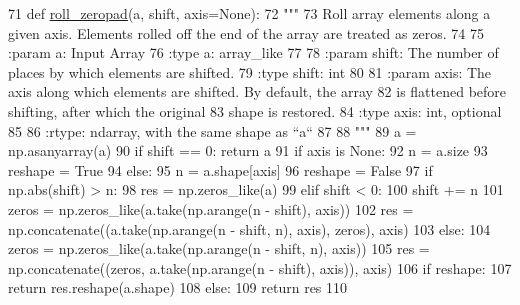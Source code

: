 \begin{DoxyCode}
71 \textcolor{keyword}{def }\hyperlink{namespacesoftware_1_1chipwhisperer_1_1analyzer_1_1preprocessing_1_1AddNoiseJitter_a790f3f20f0f53b393f42bd693cb5182a}{roll\_zeropad}(a, shift, axis=None):
72     \textcolor{stringliteral}{"""}
73 \textcolor{stringliteral}{    Roll array elements along a given axis. Elements rolled off the end of the array are treated as zeros.}
74 \textcolor{stringliteral}{}
75 \textcolor{stringliteral}{    :param a: Input Array}
76 \textcolor{stringliteral}{    :type a: array\_like}
77 \textcolor{stringliteral}{    }
78 \textcolor{stringliteral}{    :param shift: The number of places by which elements are shifted.}
79 \textcolor{stringliteral}{    :type shift: int}
80 \textcolor{stringliteral}{}
81 \textcolor{stringliteral}{    :param axis: The axis along which elements are shifted.  By default, the array}
82 \textcolor{stringliteral}{                 is flattened before shifting, after which the original}
83 \textcolor{stringliteral}{                 shape is restored.}
84 \textcolor{stringliteral}{    :type axis: int, optional      }
85 \textcolor{stringliteral}{}
86 \textcolor{stringliteral}{    :rtype: ndarray, with the same shape as ``a``}
87 \textcolor{stringliteral}{}
88 \textcolor{stringliteral}{    """}
89     a = np.asanyarray(a)
90     \textcolor{keywordflow}{if} shift == 0: \textcolor{keywordflow}{return} a
91     \textcolor{keywordflow}{if} axis \textcolor{keywordflow}{is} \textcolor{keywordtype}{None}:
92         n = a.size
93         reshape = \textcolor{keyword}{True}
94     \textcolor{keywordflow}{else}:
95         n = a.shape[axis]
96         reshape = \textcolor{keyword}{False}
97     \textcolor{keywordflow}{if} np.abs(shift) > n:
98         res = np.zeros\_like(a)
99     \textcolor{keywordflow}{elif} shift < 0:
100         shift += n
101         zeros = np.zeros\_like(a.take(np.arange(n - shift), axis))
102         res = np.concatenate((a.take(np.arange(n - shift, n), axis), zeros), axis)
103     \textcolor{keywordflow}{else}:
104         zeros = np.zeros\_like(a.take(np.arange(n - shift, n), axis))
105         res = np.concatenate((zeros, a.take(np.arange(n - shift), axis)), axis)
106     \textcolor{keywordflow}{if} reshape:
107         \textcolor{keywordflow}{return} res.reshape(a.shape)
108     \textcolor{keywordflow}{else}:
109         \textcolor{keywordflow}{return} res
110 \end{DoxyCode}
